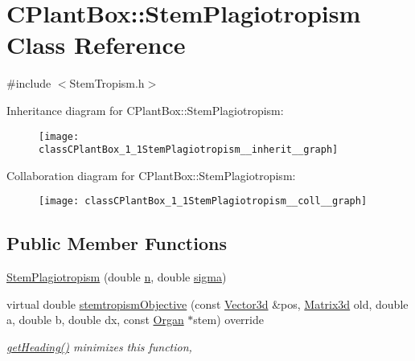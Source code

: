 \hypertarget{classCPlantBox_1_1StemPlagiotropism}{}\section{C\+Plant\+Box\+:\+:Stem\+Plagiotropism Class Reference}
\label{classCPlantBox_1_1StemPlagiotropism}


{\ttfamily \#include $<$Stem\+Tropism.\+h$>$}



Inheritance diagram for C\+Plant\+Box\+:\+:Stem\+Plagiotropism\+:\nopagebreak
\begin{figure}[H]
\begin{center}
\leavevmode
\texttt{[image: classCPlantBox\_1\_1StemPlagiotropism\_\_inherit\_\_graph]}
\end{center}
\end{figure}


Collaboration diagram for C\+Plant\+Box\+:\+:Stem\+Plagiotropism\+:\nopagebreak
\begin{figure}[H]
\begin{center}
\leavevmode
\texttt{[image: classCPlantBox\_1\_1StemPlagiotropism\_\_coll\_\_graph]}
\end{center}
\end{figure}
\subsection*{Public Member Functions}
\begin{DoxyCompactItemize}
\item 
\hyperlink{classCPlantBox_1_1StemPlagiotropism_a6e927c51c5ff6a9cd9c1f519113249c1}{Stem\+Plagiotropism} (double \hyperlink{classCPlantBox_1_1StemTropismFunction_a54ebffbb66feb026ce61d57f17d4d25a}{n}, double \hyperlink{classCPlantBox_1_1StemTropismFunction_a79ea448c44b07fb59d85e9d130190994}{sigma})
\item 
virtual double \hyperlink{classCPlantBox_1_1StemPlagiotropism_acd9683f767047657ad3f272b8cc8e124}{stemtropism\+Objective} (const \hyperlink{classCPlantBox_1_1Vector3d}{Vector3d} \&pos, \hyperlink{classCPlantBox_1_1Matrix3d}{Matrix3d} old, double a, double b, double dx, const \hyperlink{classCPlantBox_1_1Organ}{Organ} $\ast$stem) override
\begin{DoxyCompactList}\small\item\em \hyperlink{classCPlantBox_1_1StemTropismFunction_ac72f7ad1200d1defbb3c9b20e20d1f62}{get\+Heading()} minimizes this function, \end{DoxyCompactList}\end{DoxyCompactItemize}
